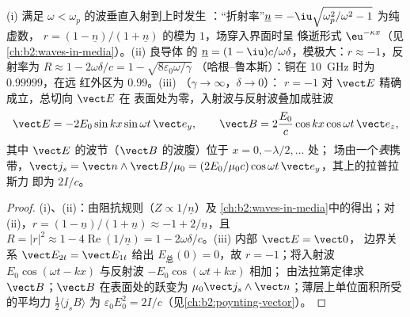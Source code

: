 \begin{proposition}[等离子体与金属上的反射]\label{prop:b2:wave-interfaces:conductors}
(i) 满足 $\omega < \omega_p$ 的波垂直入射到上时发生
：“折射率”$\underline n = -\iu\sqrt{\omega_p^2/\omega^2 - 1}$ 为纯虚数，
$r = (1 - \underline n)/(1 + \underline n)$ 的模为 $1$，场穿入界面时呈
倏逝形式 $\eu^{-\kappa x}$（见\cref{ch:b2:waves-in-media}）。(ii) 良导体
的 $\underline n = (1 - \iu)c/\omega\delta$，模极大：$r \approx
-1$，反射率为 $R \approx 1 - 2\omega\delta/c = 1 - \sqrt{8\varepsilon_0\omega/\gamma}$
（哈根–鲁本斯）：铜在 \qty{10}{GHz} 时为 $0.99999$，在远
红外区为 $0.99$。(iii) \emph{}（$\gamma \to \infty$，$\delta \to 0$）：
$r = -1$ 对 $\vect E$ 精确成立，总切向 $\vect E$ 在
表面处为零，入射波与反射波叠加成驻波
\[
\vect E = -2E_0\sin kx\sin\omega t\,\vect e_y , \qquad
\vect B = 2\frac{E_0}c\cos kx\cos\omega t\,\vect e_z ,
\]
其中 $\vect E$ 的波节（$\vect B$ 的波腹）位于 $x = 0, -\lambda/2, \dots$ 处；
场由一个\emph{表}携带，$\vect j_s = \vect n\wedge\vect B/
\mu_0 = (2E_0/\mu_0c)\cos\omega t\,\vect e_y$，其上的拉普拉斯力
即为 $2I/c$。
\end{proposition}

\begin{proof}
(i)、(ii)：由阻抗规则（$Z \propto 1/\underline n$）及
\cref{ch:b2:waves-in-media}中的得出；对 (ii)，$r = (1 - \underline n)/(1 +
\underline n) \approx -1 + 2/\underline n$，且 $R = |r|^2 \approx 1 - 4\operatorname{Re}(1/
\underline n) = 1 - 2\omega\delta/c$。(iii) 内部 $\vect E = \vect 0$，
边界关系 $\vect E_{2t} = \vect E_{1t}$ 给出 $E_{\text{总}}(0) = 0$，故 $r =
-1$；将入射波 $E_0\cos(\omega t - kx)$ 与反射波 $-E_0\cos(\omega t + kx)$ 相加；
由法拉第定律求 $\vect B$；$\vect B$ 在表面处的跃变为 $\mu_0\vect j_s
\wedge\vect n$；薄层上单位面积所受的平均力 $\tfrac12\langle j_sB\rangle$ 为
$\varepsilon_0E_0^2 = 2I/c$（见\cref{ch:b2:poynting-vector}）。
\end{proof}

